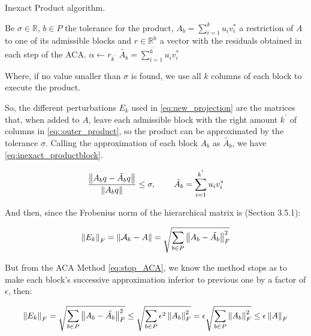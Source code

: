 \begin{algorithm}
    \caption{Inexact Product algorithm.}\label{alg:inexact_product}
    \begin{algorithmic}[1]
        \State Be $\sigma \in \mathbb{R}$, $b \in P$ the tolerance for the product,  $A_{b}= \sum_{i=1}^{k}u_{i}v_{i}^{*}$ a restriction of $A$ to one of its admissible blocks and $r \in \mathbb{R^{k}}$ a vector with the residuals obtained in each step of the ACA.
        \State $\alpha \leftarrow r_{k^{'}}$
        \If{$\alpha \leq \sigma$}
        \State $\tilde{A_{b}}=\sum_{i=1}^{k^{'}}u_{i}v_{i}^{*}$
        \EndIf
        \EndFor

    \end{algorithmic}
\end{algorithm}

Where, if no value smaller than $\sigma$ is found, we use all $k$ columns of each block to execute the product.

So, the different perturbations $E_{k}$ used in \ref{eq:new_projection} are the matrices that, when added to $A$, leave each admissible block with the right amount $k^{'}$ of columns in \ref{eq::outer_product}, so the product can be approximated by the tolerance $\sigma$. Calling the approximation of each block $A_{b}$ as $\tilde{A_{b}}$, we have \ref{eq:inexact_productblock}.

\begin{equation}\label{eq:inexact_productblock}
    \frac{\left\lVert A_{b}q - \tilde{A_{b}}q \right\rVert}{\left\lVert A_{b}q\right\rVert} \leq \sigma, \hspace{0.3in} \tilde{A_{b}} = \sum_{i=1} ^{k^{'}} u_{i} v_{i} ^{*}
\end{equation}


And then, since the Frobenius norm of the hierarchical matrix is \cite{hackbusch2015hierarchical}(Section 3.5.1):

\begin{equation}
    \left\lVert E_{k}\right\rVert_{F}= \left\lVert\mathcal{A}_{k} - A\right\rVert = \sqrt{\sum_{b \in P} \left\lVert A_{b} - \tilde{A_{b}}\right\rVert_{F}^{2} }
\end{equation}

But from the ACA Method \ref{eq:stop_ACA}, we know the method stops as to make each block's successive approximation inferior to previous one by a factor of $\epsilon$, then:

\begin{equation}
    \left\lVert E_{k}\right\rVert_{F} = \sqrt{\sum_{b \in P} \left\lVert A_{b} - \tilde{A_{b}}\right\rVert_{F}^{2} } \leq \sqrt{\sum_{b\in P}\epsilon^{2}\left\lVert A_{b}\right\rVert_{F}^{2}} = \epsilon \sqrt{\sum_{b \in P}\left\lVert A_{b}\right\rVert_{F}^{2}}
    \leq \epsilon \left\lVert A\right\rVert_{F}
\end{equation}


